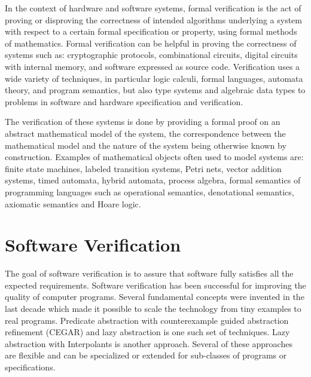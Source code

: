 \label{ch:intro}

In the context of hardware and software systems, formal verification is the act of
proving or disproving the correctness of intended algorithms underlying a system with
respect to a certain formal specification or property, using formal methods of
mathematics. Formal verification can be helpful in proving the correctness of systems
such as: cryptographic protocols, combinational circuits, digital circuits with internal
memory, and software expressed as source code. Verification uses a wide variety of
techniques, in particular logic calculi, formal languages, automata theory, and program
semantics, but also type systems and algebraic data types to problems in software and
hardware specification and verification.

The verification of these systems is done by providing a formal proof on an abstract
mathematical model of the system, the correspondence between the mathematical model and
the nature of the system being otherwise known by construction. Examples of mathematical
objects often used to model systems are: finite state machines, labeled transition
systems, Petri nets, vector addition systems, timed automata, hybrid automata, process
algebra, formal semantics of programming languages such as operational semantics,
denotational semantics, axiomatic semantics and Hoare logic.

\section{Software Verification}

The goal of software verification is to assure that software fully satisfies all the
expected requirements. Software verification has been successful for improving the
quality of computer programs. Several fundamental concepts were invented in the last
decade which made it possible to scale the technology from tiny examples to real
programs. Predicate abstraction \cite{ball01} with counterexample guided abstraction
refinement (CEGAR) \cite{clarke03} and lazy abstraction \cite{henzinger02} is one such
set of techniques. Lazy abstraction with Interpolants \cite{mcmillan06} is another
approach. Several of these approaches are flexible and can be specialized or extended for
sub-classes of programs or specifications.

